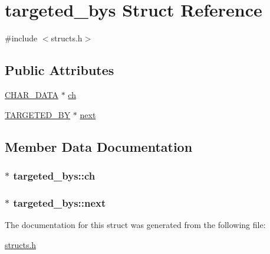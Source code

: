 \hypertarget{structtargeted__bys}{\section{targeted\-\_\-bys Struct Reference}
\label{structtargeted__bys}
}


{\ttfamily \#include $<$structs.\-h$>$}

\subsection*{Public Attributes}
\begin{DoxyCompactItemize}
\item 
\hyperlink{structs_8h_af33ed1e66e8541a08bed257124f50f31}{C\-H\-A\-R\-\_\-\-D\-A\-T\-A} $\ast$ \hyperlink{structtargeted__bys_a85f1dccc22c98b0d6245840ef5fd23ce}{ch}
\item 
\hyperlink{structs_8h_aeb9ebe2d6c6fb51e9a2808790ab7c0b7}{T\-A\-R\-G\-E\-T\-E\-D\-\_\-\-B\-Y} $\ast$ \hyperlink{structtargeted__bys_a3c0d38fd90dfa918efb00f718b5607ba}{next}
\end{DoxyCompactItemize}


\subsection{Member Data Documentation}
\hypertarget{structtargeted__bys_a85f1dccc22c98b0d6245840ef5fd23ce}{
\subsubsection[{ch}]{$\ast$ targeted\-\_\-bys\-::ch}}\label{structtargeted__bys_a85f1dccc22c98b0d6245840ef5fd23ce}
\hypertarget{structtargeted__bys_a3c0d38fd90dfa918efb00f718b5607ba}{
\subsubsection[{next}]{$\ast$ targeted\-\_\-bys\-::next}}\label{structtargeted__bys_a3c0d38fd90dfa918efb00f718b5607ba}


The documentation for this struct was generated from the following file\-:\begin{DoxyCompactItemize}
\item 
\hyperlink{structs_8h}{structs.\-h}\end{DoxyCompactItemize}
